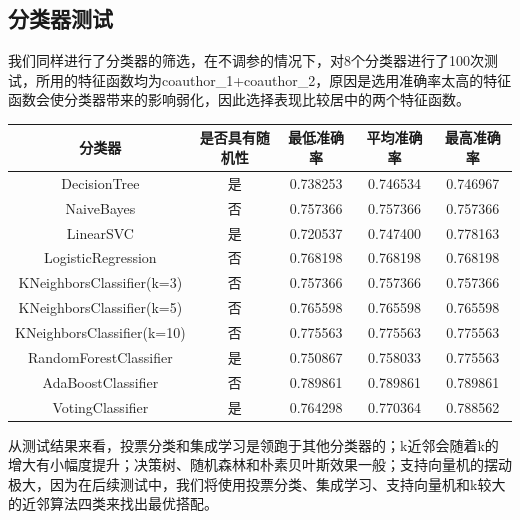 \documentclass{mcmthesis}
\begin{document}
\subsection{分类器测试}
\par 我们同样进行了分类器的筛选，在不调参的情况下，对8个分类器进行了100次测试，所用的特征函数均为coauthor\_1+coauthor\_2，原因是选用准确率太高的特征函数会使分类器带来的影响弱化，因此选择表现比较居中的两个特征函数。
\begin{center}
	\begin{tabular}{ccccc}
		\hline
		分类器 & 是否具有随机性 & 最低准确率 &平均准确率 & 最高准确率 \\
		\hline          
		DecisionTree & 是 & 0.738253 & 0.746534 & 0.746967 \\
		NaiveBayes & 否 & 0.757366 & 0.757366 & 0.757366  \\
		LinearSVC & 是 & 0.720537 & 0.747400 & 0.778163 \\
		LogisticRegression & 否 & 0.768198 & 0.768198 & 0.768198  \\
		KNeighborsClassifier(k=3) & 否 & 0.757366 & 0.757366 & 0.757366 \\
		KNeighborsClassifier(k=5) & 否 & 0.765598 & 0.765598 & 0.765598 \\
		KNeighborsClassifier(k=10) & 否 & 0.775563 & 0.775563 & 0.775563 \\
		RandomForestClassifier & 是 & 0.750867 & 0.758033 & 0.775563\\
		 	AdaBoostClassifier & 否 & 0.789861 & 0.789861 & 0.789861\\
		VotingClassifier & 是 & 0.764298& 0.770364& 0.788562\\
		\hline
	\end{tabular}
\end{center}
\par 从测试结果来看，投票分类和集成学习是领跑于其他分类器的；k近邻会随着k的增大有小幅度提升；决策树、随机森林和朴素贝叶斯效果一般；支持向量机的摆动极大，因为在后续测试中，我们将使用投票分类、集成学习、支持向量机和k较大的近邻算法四类来找出最优搭配。
\end{document}
